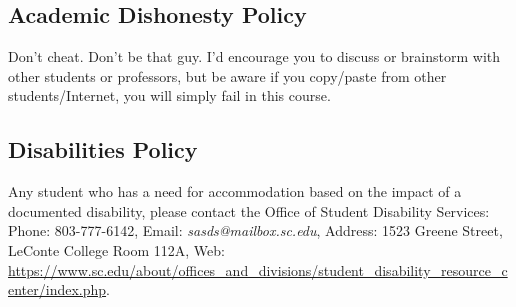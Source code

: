 \documentclass[11pt]{article}
\newcommand{\week}[1]{%
  \paragraph*{\kern-2ex\quad #1, \syldate{\today} - \AdvanceDate[4]\syldate{\today}:}%
  \ifdim\wd1=\wd\MONDAY
    \AdvanceDate[7]
  \else
    \AdvanceDate[7]
  \fi%
}
\begin{document}
\subsection*{Academic Dishonesty Policy}

Don't cheat. Don't be that guy. I'd encourage you to discuss or brainstorm with other students or professors, but be aware if you copy/paste from other students/Internet, you will simply fail in this course. 

\subsection*{Disabilities Policy}

Any student who has a need for accommodation based on the impact of
a documented disability, please contact the Office of Student Disability Services: Phone: 803-777-6142, Email: \textit{sasds@mailbox.sc.edu}, Address: 1523 Greene Street, LeConte College Room 112A, Web: \url{https://www.sc.edu/about/offices_and_divisions/student_disability_resource_center/index.php}.






\end{document}

